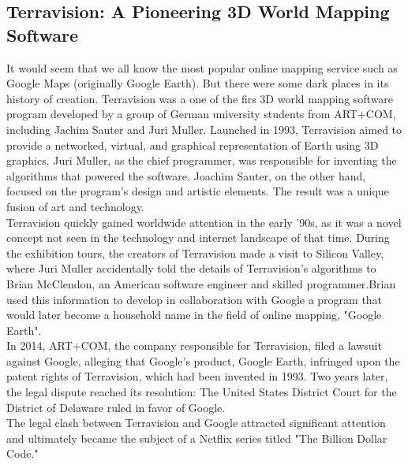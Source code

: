 \documentclass[10pt,oneside,english,a4paper]{article}
\begin{document}
\subsection{Terravision: A Pioneering 3D World Mapping Software} \label{history:patentrights}
It would seem that we all know the most popular online mapping service such as Google Maps (originally Google Earth). But there were some dark places in its history of creation. Terravision\cite{Leclerc1994} was a one of the firs 3D world mapping software program developed by a group of German university students from ART+COM, including Jachim Sauter and Juri Muller. Launched in 1993, Terravision aimed to provide a networked, virtual, and graphical representation of Earth using 3D graphics. Juri Muller, as the chief programmer, was responsible for inventing the algorithms that powered the software. Joachim Sauter, on the other hand, focused on the program's design and artistic elements. The result was a unique fusion of art and technology.
\\Terravision quickly gained worldwide attention in the early '90s, as it was a novel concept not seen in the technology and internet landscape of that time. During the exhibition tours, the creators of Terravision made a visit to Silicon Valley, where Juri Muller accidentally told the details of Terravision's algorithms to Brian McClendon, an American software engineer and skilled programmer.Brian used this information to develop in collaboration with Google a program that would later become a household name in the field of online mapping, "Google Earth".
\\In 2014, ART+COM, the company responsible for Terravision, filed a lawsuit against Google, alleging that Google's product, Google Earth, infringed upon the patent rights of Terravision, which had been invented in 1993. Two years later, the legal dispute reached its resolution: The United States District Court for the District of Delaware ruled in favor of Google.
\\The legal clash between Terravision and Google attracted significant attention and ultimately became the subject of a Netflix series titled "The Billion Dollar Code."
\end{document}
